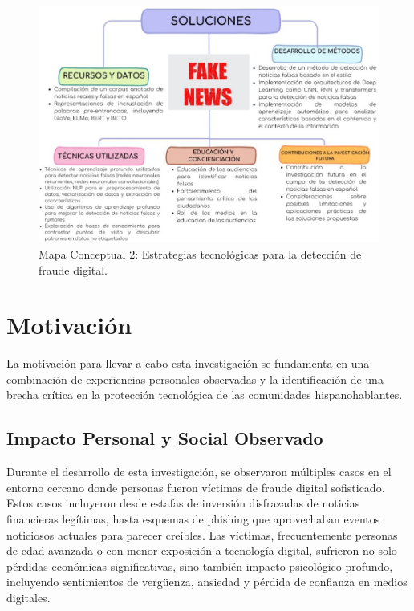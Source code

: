 \begin{figure}[h!]
    \centering
    \includegraphics[width=\textwidth]{Imagenes/mapaConceptual2.png}
    \caption{Mapa Conceptual 2: Estrategias tecnológicas para la detección de fraude digital.}
    \label{fig:mapa_soluciones}
\end{figure}

\section{Motivación}

La motivación para llevar a cabo esta investigación se fundamenta en una combinación de experiencias personales observadas y la identificación de una brecha crítica en la protección tecnológica de las comunidades hispanohablantes.

\subsection{Impacto Personal y Social Observado}

Durante el desarrollo de esta investigación, se observaron múltiples casos en el entorno cercano donde personas fueron víctimas de fraude digital sofisticado. Estos casos incluyeron desde estafas de inversión disfrazadas de noticias financieras legítimas, hasta esquemas de phishing que aprovechaban eventos noticiosos actuales para parecer creíbles. Las víctimas, frecuentemente personas de edad avanzada o con menor exposición a tecnología digital, sufrieron no solo pérdidas económicas significativas, sino también impacto psicológico profundo, incluyendo sentimientos de vergüenza, ansiedad y pérdida de confianza en medios digitales.

